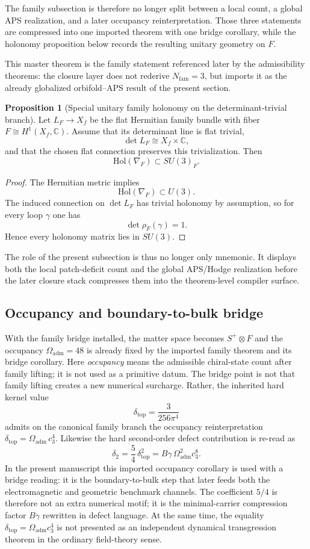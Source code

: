 \documentclass[11pt,a4paper]{article}
\theoremstyle{definition}
\newtheorem{proposition}[theorem]{Proposition}
\theoremstyle{remark}
\newcommand{\cthree}{c_3}
\newcommand{\deltatop}{\delta_{\mathrm{top}}}
\newcommand{\Oadm}{\Omega_{\mathrm{adm}}}
\begin{document}
The family subsection is therefore no longer split between a local count, a global APS realization, and a later occupancy reinterpretation. Those three statements are compressed into one imported theorem with one bridge corollary, while the holonomy proposition below records the resulting unitary geometry on $F$.

This master theorem is the family statement referenced later by the admissibility theorems: the closure layer does not rederive $N_{\mathrm{fam}}=3$, but imports it as the already globalized orbifold--APS result of the present section.

\begin{proposition}[Special unitary family holonomy on the determinant-trivial branch]
\label{prop:family-holonomy-su3}
Let $L_F\to X_f$ be the flat Hermitian family bundle with fiber
$F\cong H^1(X_f,\mathbb C)$. Assume that its determinant line is flat trivial,
\[
\det L_F \cong X_f\times \mathbb C,
\]
and that the chosen flat connection preserves this trivialization. Then
\[
\mathrm{Hol}(\nabla_F)\subset SU(3)_F.
\]
\end{proposition}

\begin{proof}
The Hermitian metric implies
\[
\mathrm{Hol}(\nabla_F)\subset U(3).
\]
The induced connection on $\det L_F$ has trivial holonomy by assumption, so for
every loop $\gamma$ one has
\[
\det \rho_F(\gamma)=1.
\]
Hence every holonomy matrix lies in $SU(3)$.
\end{proof}

The role of the present subsection is thus no longer only mnemonic. It displays both the local patch-deficit count and the global APS/Hodge realization before the later closure stack compresses them into the theorem-level compiler surface.

\subsection{Occupancy and boundary-to-bulk bridge}

With the family bridge installed, the matter space becomes $S^+\otimes F$ and the occupancy $\Oadm=48$ is already fixed by the imported family theorem and its bridge corollary. Here \emph{occupancy} means the admissible chiral-state count after family lifting; it is not used as a primitive datum. The bridge point is not that family lifting creates a new numerical surcharge. Rather, the inherited hard kernel value
\[
\deltatop=\frac{3}{256\pi^4}
\]
admits on the canonical family branch the occupancy reinterpretation $\deltatop=\Oadm\,\cthree^4$.
Likewise the hard second-order defect contribution is re-read as
\[
\delta_2=\frac54\,\deltatop^2=B\gamma\,\Oadm^2\cthree^8.
\]
In the present manuscript this imported occupancy corollary is used with a bridge reading: it is the boundary-to-bulk step that later feeds both the electromagnetic and geometric benchmark channels. The coefficient $5/4$ is therefore not an extra numerical motif; it is the minimal-carrier compression factor $B\gamma$ rewritten in defect language. At the same time, the equality $\deltatop=\Oadm\cthree^4$ is not presented as an independent dynamical transgression theorem in the ordinary field-theory sense.
\end{document}
